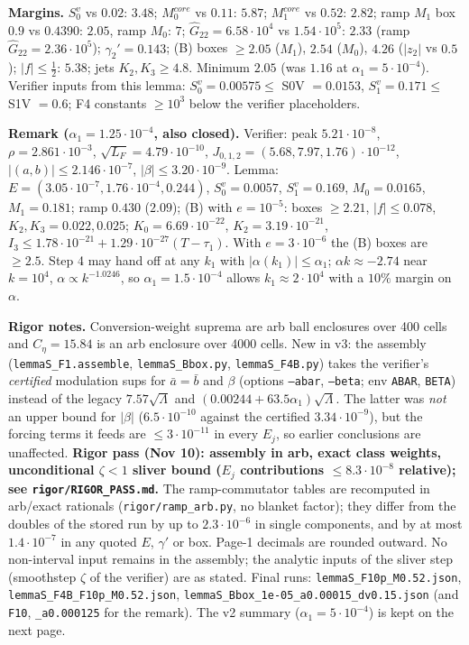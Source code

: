 \documentclass[11pt]{article}
\begin{document}
\noindent\textbf{Margins.} $S_0^v$ vs $0.02$: $3.48$; $M_0^{core}$ vs $0.11$: $5.87$; $M_1^{core}$ vs $0.52$: $2.82$; ramp $M_1$ box $0.9$ vs $0.4390$: $\mathbf{2.05}$, ramp $M_0$: $7$; $\hat G_{22}=6.58\cdot10^4$ vs $1.54\cdot10^5$: $2.33$ (ramp $\hat G_{22}=2.36\cdot10^5$); $\gamma_2'=0.143$; (B) boxes $\ge2.05$ ($M_1$), $2.54$ ($M_0$), $4.26$ ($|z_2|$ vs $0.5$); $|f|\le\tfrac12$: $5.38$; jets $K_2,K_3\ge4.8$. Minimum $2.05$ (was $1.16$ at $\alpha_1=5\cdot10^{-4}$). Verifier inputs from this lemma: $S_0^v=0.00575\le$ S0V $=0.0153$, $S_1^v=0.171\le$ S1V $=0.6$; F4 constants $\ge10^3$ below the verifier placeholders.

\noindent\textbf{Remark ($\alpha_1=1.25\cdot10^{-4}$, also closed).} Verifier: peak $5.21\cdot10^{-8}$, $\rho=2.861\cdot10^{-3}$, $\sqrt{L_F}=4.79\cdot10^{-10}$, $J_{0,1,2}=(5.68,7.97,1.76)\cdot10^{-12}$, $|(a,b)|\le2.146\cdot10^{-7}$, $|\beta|\le3.20\cdot10^{-9}$. Lemma: $E=(3.05\cdot10^{-7},1.76\cdot10^{-4},0.244)$, $S_0^v=0.0057$, $S_1^v=0.169$, $M_0=0.0165$, $M_1=0.181$; ramp $0.430$ ($2.09$); (B) with $e=10^{-5}$: boxes $\ge2.21$, $|f|\le0.078$, $K_2,K_3=0.022,0.025$; $K_0=6.69\cdot10^{-22}$, $K_2=3.19\cdot10^{-21}$, $I_3\le1.78\cdot10^{-21}+1.29\cdot10^{-27}(T-\tau_1)$. With $e=3\cdot10^{-6}$ the (B) boxes are $\ge2.5$. Step 4 may hand off at any $k_1$ with $|\alpha(k_1)|\le\alpha_1$; $\alpha k\approx-2.74$ near $k=10^4$, $\alpha\propto k^{-1.0246}$, so $\alpha_1=1.5\cdot10^{-4}$ allows $k_1\approx2\cdot10^4$ with a $10\%$ margin on $\alpha$.

\noindent\textbf{Rigor notes.} Conversion-weight suprema are arb ball enclosures over 400 cells and $C_\eta=15.84$ is an arb enclosure over 4000 cells. New in v3: the assembly (\texttt{lemmaS\_F1.assemble}, \texttt{lemmaS\_Bbox.py}, \texttt{lemmaS\_F4B.py}) takes the verifier's \emph{certified} modulation sups for $\bar a=\bar b$ and $\beta$ (options \texttt{--abar}, \texttt{--beta}; env \texttt{ABAR}, \texttt{BETA}) instead of the legacy $7.57\sqrt\Lambda$ and $(0.00244+63.5\alpha_1)\sqrt\Lambda$. The latter was \emph{not} an upper bound for $|\beta|$ ($6.5\cdot10^{-10}$ against the certified $3.34\cdot10^{-9}$), but the forcing terms it feeds are $\le3\cdot10^{-11}$ in every $E_j$, so earlier conclusions are unaffected. \textbf{Rigor pass (Nov 10): assembly in arb, exact class weights, unconditional $\zeta<1$ sliver bound ($E_j$ contributions $\le8.3\cdot10^{-8}$ relative); see \texttt{rigor/RIGOR\_PASS.md}.} The ramp-commutator tables are recomputed in arb/exact rationals (\texttt{rigor/ramp\_arb.py}, no blanket factor); they differ from the doubles of the stored run by up to $2.3\cdot10^{-6}$ in single components, and by at most $1.4\cdot10^{-7}$ in any quoted $E$, $\gamma'$ or box. Page-1 decimals are rounded outward. No non-interval input remains in the assembly; the analytic inputs of the sliver step (smoothstep $\zeta$ of the verifier) are as stated. Final runs: \texttt{lemmaS\_F10p\_M0.52.json}, \texttt{lemmaS\_F4B\_F10p\_M0.52.json}, \texttt{lemmaS\_Bbox\_1e-05\_a0.00015\_dv0.15.json} (and \texttt{F10}, \texttt{\_a0.000125} for the remark). The v2 summary ($\alpha_1=5\cdot10^{-4}$) is kept on the next page.
\normalsize\newpage
\end{document}
